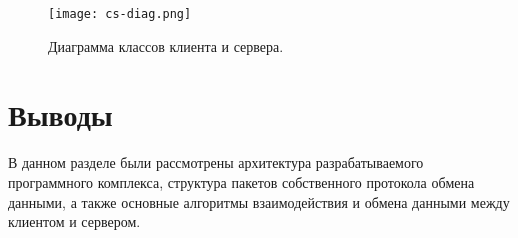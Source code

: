 \begin{figure}[h]
  \centering
  \texttt{[image: cs-diag.png]}
  \caption{Диаграмма классов клиента и сервера.}
\end{figure}

\section{Выводы}
В данном разделе были рассмотрены архитектура разрабатываемого программного комплекса, структура пакетов собственного протокола обмена данными, а также основные алгоритмы взаимодействия и обмена данными между клиентом и сервером.